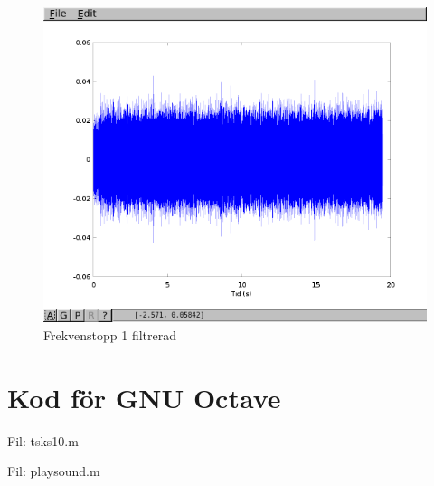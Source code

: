 \documentclass[10pt]{article}
\begin{document}
\begin{figure}[htp]
  \begin{center}
  \includegraphics[keepaspectratio=true,width=\linewidth]{topp3_filter.png}  %
  \end{center}
  \caption{Frekvenstopp 1 filtrerad} %
  \label{fig:topp3_filter}
\end{figure}

\newpage
\section{Kod för GNU Octave}

Fil: tsks10.m



\newpage

Fil: playsound.m


\end{document}

